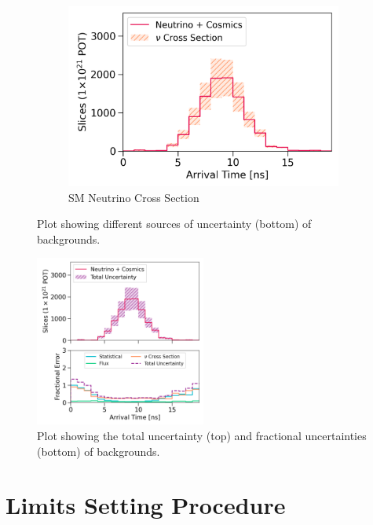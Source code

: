 \begin{figure}[htbp!]
\begin{subfigure}[b]{0.495\textwidth}
            \includegraphics[width=\textwidth]{bkg_xsec_error}
            \caption{SM Neutrino Cross Section}%
            \label{fig:bkg_xsec}
        \end{subfigure}
        \caption{
	Plot showing different sources of uncertainty (bottom) of backgrounds.
	}
        \label{fig:bkg_error}
	\vspace{0.5cm}
\centering    
\includegraphics[width=0.5\textwidth]{bkg_error}
\caption[bkg_error]{
Plot showing the total uncertainty (top) and fractional uncertainties (bottom) of backgrounds.
}
\label{fig:bkg_total_error}
\end{figure}

\section{Limits Setting Procedure}
\label{sec:limit_procedure}

